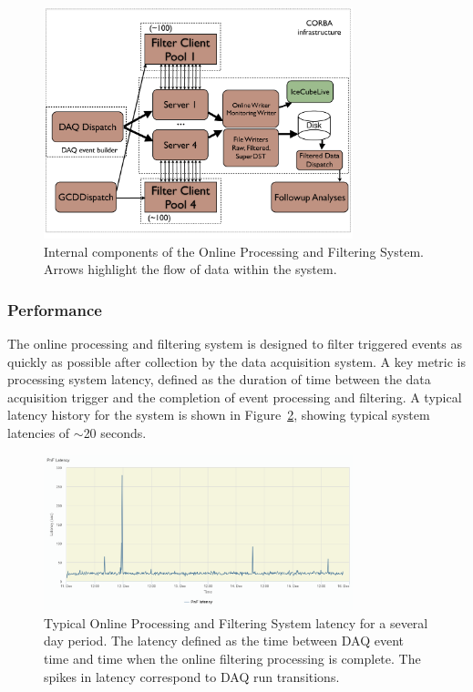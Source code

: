 \begin{figure}[!h]
 \centering
 \includegraphics[width=0.8\textwidth]{graphics/online/pnf/PnF_Internals.pdf}
 \caption{Internal components of the Online Processing and Filtering System.  Arrows highlight the flow of data within the system.}
 \label{fig:online_pnf_internals}
\end{figure}

\subsubsection{Performance}
The online processing and filtering system is designed to filter triggered events as quickly as possible after collection by
the data acquisition system.   A key metric is processing system latency, defined as the duration of time between the data acquisition trigger 
and the completion of event processing and filtering.  A typical latency history for the system is shown in Figure~\ref{fig:online_pnf_latency}, showing
typical system latencies of $\sim$20 seconds.

\begin{figure}[!h]
 \centering
 \includegraphics[width=0.8\textwidth]{graphics/online/pnf/pnf_latency.png}
 \caption{Typical Online Processing and Filtering System latency for a several day period.  The latency defined as the time between DAQ event time and time when the
 online filtering processing is complete.  The spikes in latency correspond to DAQ run transitions.}
 \label{fig:online_pnf_latency}
\end{figure}

